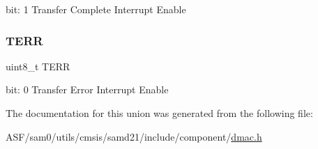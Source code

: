 bit\+: 1 Transfer Complete Interrupt Enable \mbox{\label{union_d_m_a_c___c_h_i_n_t_e_n_s_e_t___type_aec94f800e27f13d8235935c375e2c7c2}} 
\subsubsection{\texorpdfstring{TERR}{TERR}}
{\footnotesize\ttfamily uint8\+\_\+t T\+E\+RR}

bit\+: 0 Transfer Error Interrupt Enable 

The documentation for this union was generated from the following file\+:\begin{DoxyCompactItemize}
\item 
A\+S\+F/sam0/utils/cmsis/samd21/include/component/\mbox{\hyperlink{component_2dmac_8h}{dmac.\+h}}\end{DoxyCompactItemize}
